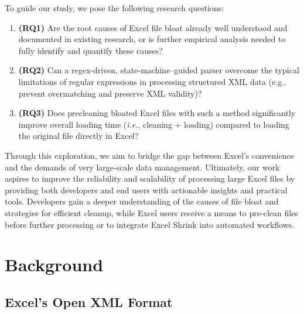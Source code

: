 \documentclass[conference]{IEEEtran}
\begin{document}
To guide our study, we pose the following research questions:

\begin{enumerate}  
\item \textbf{(RQ1)} Are the root causes of Excel file bloat already well understood and documented in existing research, or is further empirical analysis needed to fully identify and quantify these causes?
\item \textbf{(RQ2)} Can a regex-driven, state-machine–guided parser overcome the typical limitations of regular expressions in processing structured XML data (e.g., prevent overmatching and preserve XML validity)?
\item \textbf{(RQ3)} Does precleaning bloated Excel files with such a method significantly improve overall loading time (\emph{i.e.}, cleaning + loading) compared to loading the original file directly in Excel?

\end{enumerate}

Through this exploration, we aim to bridge the gap between Excel’s convenience and the demands of very large-scale data management. Ultimately, our work aspires to improve the reliability and scalability of processing large Excel files by providing both developers and end users with actionable insights and practical tools. Developers gain a deeper understanding of the causes of file bloat and strategies for efficient cleanup, while Excel users receive a means to pre-clean files before further processing or to integrate Excel Shrink into automated workflows.




\section{Background}

\subsection{Excel's Open XML Format}
\end{document}
